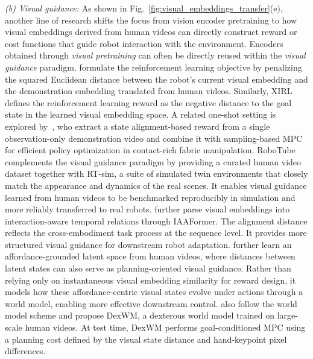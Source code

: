 \documentclass[Afour,sageh,times]{sagej}
\begin{document}
\textit{(b) Visual guidance:} As shown in Fig.~\ref{fig:visual_embeddings_transfer}(e), another line of research shifts the focus from vision encoder pretraining to how visual embeddings derived from human videos can directly construct reward or cost functions that guide robot interaction with the environment. Encoders obtained through \textit{visual pretraining} can often be directly reused within the \textit{visual guidance} paradigm. \cite{liu2018imitation} formulate the reinforcement learning objective by penalizing the squared Euclidean distance between the robot's current visual embedding and the demonstration embedding translated from human videos. Similarly, XIRL~\citep{zakka2022xirl} defines the reinforcement learning reward as the negative distance to the goal state in the learned visual embedding space. A related one-shot setting is explored by~\cite{huo2023efficient}, who extract a state alignment-based reward from a single observation-only demonstration video and combine it with sampling-based MPC for efficient policy optimization in contact-rich fabric manipulation. RoboTube~\citep{xiong2022robotube} complements the visual guidance paradigm by providing a curated human video dataset together with RT-sim, a suite of simulated twin environments that closely match the appearance and dynamics of the real scenes. It enables visual guidance learned from human videos to be benchmarked reproducibly in simulation and more reliably transferred to real robots. \cite{qian2024contrast} further parse visual embeddings into interaction-aware temporal relations through IAAFormer. The alignment distance reflects the cross-embodiment task process at the sequence level. It provides more structured visual guidance for downstream robot adaptation. \cite{mendonca2023structured} further learn an affordance-grounded latent space from human videos, where distances between latent states can also serve as planning-oriented visual guidance. Rather than relying only on instantaneous visual embedding similarity for reward design, it models how these affordance-centric visual states evolve under actions through a world model, enabling more effective downstream control. \cite{goswami2025world} also follow the world model scheme and propose DexWM, a dexterous world model trained on large-scale human videos. At test time, DexWM performs goal-conditioned MPC using a planning cost defined by the visual state distance and hand-keypoint pixel differences.
\end{document}
